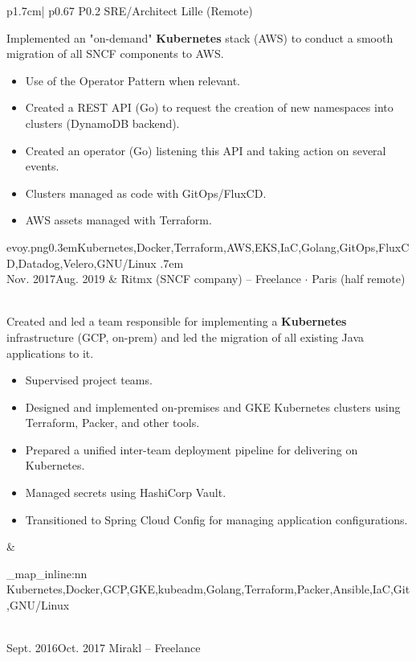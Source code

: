 \documentclass[darkhipster]{hipstercv}
\newcommand{\cvtags}[1] {
    \clist_map_inline:nn { #1 }
    {
        \cvtag{##1} %
    }
}
\newcommand{\cveventdetailed}[9]{
    {\small #1} &
    {#2 $\cdot$ \small{{#4 ~\faMapMarker}}}\vspace{.5em}\newline
    {\color{black!70}\footnotesize #5\vspace{#9}} &
    {\raisebox{-0.7\height}{\texttt{[image: \#6]}}} \vspace{#7}
    {\par \small \cvtags{#8}}
}
\begin{document}
\begin{longtable}{p{1.7cm}| p{} P{0.2\textwidth}}
        {SRE/Architect}
        {Lille (Remote)\color{cvred}}
        {
            Implemented an "on-demand" {\bfseries Kubernetes} stack (AWS) to conduct a smooth migration of all SNCF components to AWS.
            \begin{itemize}
                \item Use of the Operator Pattern when relevant.
                \item Created a REST API (Go) to request the creation of new namespaces into clusters (DynamoDB backend).
                \item Created an operator (Go) listening this API and taking action on several events.
                \item Clusters managed as code with GitOps/FluxCD.
                \item AWS assets managed with Terraform.
            \end{itemize}
        }
        {evoy.png}{0.3em}{Kubernetes,Docker,Terraform,AWS,EKS,IaC,Golang,GitOps,FluxCD,Datadog,Velero,GNU/Linux}
        {.7em} \\
    \cveventdetailed
        {Nov. 2017\newline Aug. 2019}
        {Ritmx (SNCF company) -- Freelance}
        {SRE/Architect}
        {Paris (half remote)\color{cvred}}
        {
            Created and led a team responsible for implementing a {\bfseries Kubernetes} infrastructure (GCP, on-prem) and led the migration of all existing Java applications to it.
            \begin{itemize}
                \item Supervised project teams.
                \item Designed and implemented on-premises and GKE Kubernetes clusters using Terraform, Packer, and other tools.
                \item Prepared a unified inter-team deployment pipeline for delivering on Kubernetes.
                \item Managed secrets using HashiCorp Vault.
                \item Transitioned to Spring Cloud Config for managing application configurations.
            \end{itemize}
        }
        {ritmx.png}{1.1em}{Kubernetes,Docker,GCP,GKE,kubeadm,Golang,Terraform,Packer,Ansible,IaC,Git,GNU/Linux}
        {.7em} \\
    \cveventdetailed
        {Sept. 2016\newline Oct. 2017}
        {Mirakl -- Freelance}

\end{longtable}
\end{document}
